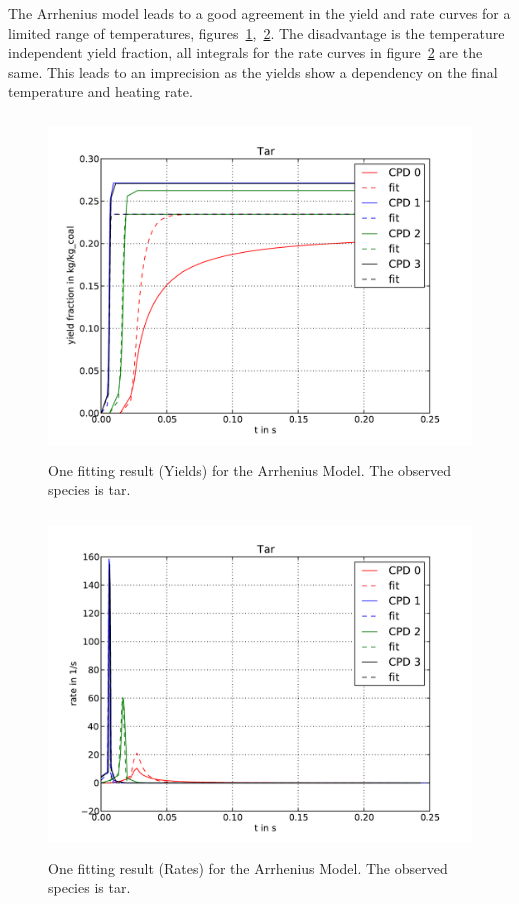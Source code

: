 The Arrhenius model leads to a good agreement in the yield and rate curves for a limited range of temperatures, figures~\ref{F_Fit_Arrh_Y},~\ref{F_Fit_Arrh_R}. The disadvantage is the temperature independent yield fraction, all integrals for the rate curves in figure~\ref{F_Fit_Arrh_R} are the same. This leads to an imprecision as the yields show a dependency on the final temperature and heating rate.


\begin{figure}
\centering%
\includegraphics[height=9cm,angle=0]{Figures/CPD-Fit_result_Arrh_Tar_Y}
\caption{One fitting result (Yields) for the Arrhenius Model. The observed species is tar.}
\label{F_Fit_Arrh_Y}
\end{figure}

\begin{figure}
\centering%
\includegraphics[height=9cm,angle=0]{Figures/CPD-Fit_result_Arrh_Tar_R}
\caption{One fitting result (Rates) for the Arrhenius Model. The observed species is tar.}
\label{F_Fit_Arrh_R}
\end{figure}

